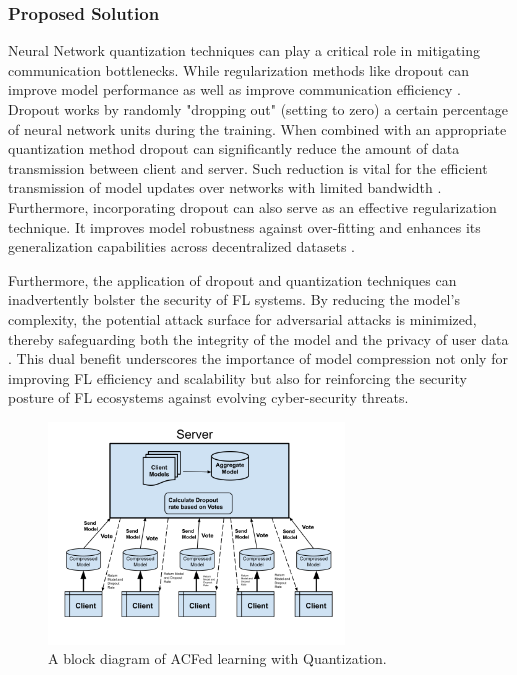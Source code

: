 \documentclass{article}
\begin{document}
\subsubsection{Proposed Solution}

Neural Network quantization techniques can play a critical role in mitigating communication bottlenecks. While regularization methods like dropout can improve model performance as well as improve communication efficiency \cite{srivastava2014dropout}. Dropout works by  randomly "dropping out" (setting to zero) a certain percentage of neural network units during the training. When combined with an appropriate quantization method dropout can significantly reduce the amount of data transmission between client and server. Such reduction is vital for the efficient transmission of model updates over networks with limited bandwidth \cite{10472332}. Furthermore, incorporating dropout can also serve as an effective regularization technique. It improves model robustness against over-fitting and enhances its generalization capabilities across decentralized datasets \cite{srivastava2014dropout,pezoulas2024fhbf}.\par

Furthermore, the application of dropout and quantization techniques can inadvertently bolster the security of FL systems. By reducing the model's complexity, the potential attack surface for adversarial attacks is minimized, thereby safeguarding both the integrity of the model and the privacy of user data \cite{TANG2024269}. This dual benefit underscores the importance of model compression not only for improving FL efficiency and scalability but also for reinforcing the security posture of FL ecosystems against evolving cyber-security threats.\par

\begin{figure}[h]
  \centering
\includegraphics[width = 0.7\textwidth, height = .55\linewidth]{img/1.Fed_Lr.png}
\caption{A block diagram of ACFed learning with Quantization.}
  \label{fig:fed_lr}
\end{figure}
\end{document}

